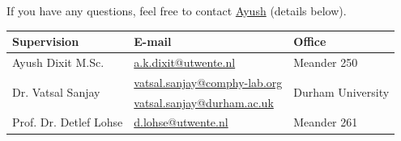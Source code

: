 \documentclass[a4paper,10pt]{article}
\begin{document}
If you have any questions, feel free to contact \href{mailto:a.k.dixit@utwente.nl}{Ayush} (details below).
\begin{center}
\begin{tabular}{|l|l|l|}
\hline \textbf{Supervision} & \textbf{E-mail} & \textbf{Office} \\
\hline Ayush Dixit M.Sc. & \href{mailto:a.k.dixit@utwente.nl}{a.k.dixit@utwente.nl} & Meander 250 \\
\hline \multirow{2}{*}{Dr. Vatsal Sanjay} & \href{mailto:vatsal.sanjay@comphy-lab.org}{vatsal.sanjay@comphy-lab.org} & \multirow{2}{*}{Durham University} \\
& \href{mailto:vatsal.sanjay@durham.ac.uk}{vatsal.sanjay@durham.ac.uk} & \\
\hline Prof. Dr. Detlef Lohse & \href{mailto:d.lohse@utwente.nl}{d.lohse@utwente.nl} & Meander 261  \\
\hline
\end{tabular}
\end{center}
\end{document}
